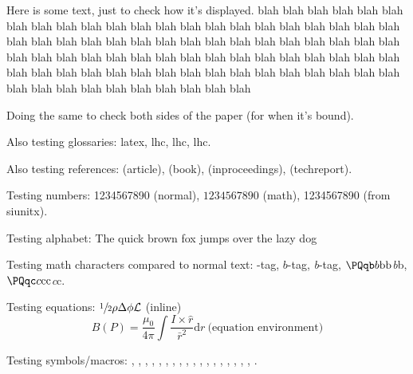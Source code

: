 \newpage

Here is some text, just to check how it's displayed. blah blah blah blah blah blah blah blah blah blah blah blah blah blah blah blah blah blah blah blah blah blah blah blah blah blah blah blah blah blah blah blah blah blah blah blah blah blah blah blah blah blah blah blah blah blah blah blah blah blah blah blah blah blah blah blah blah blah blah blah blah blah blah blah blah blah blah blah blah blah blah blah blah blah blah blah blah blah blah blah 

\newpage

Doing the same to check both sides of the paper (for when it's bound).

Also testing glossaries: \gls{latex}, \acrlong{lhc}, \acrshort{lhc}, \acrfull{lhc}.

Also testing references: \cite{CMS-PAPER-SUS-15-005-published} (article), \cite{tagkey1984quarksandleptons} (book), \cite{Lisanti:2016jxe} (inproceedings), \cite{CMS-PAS-SUS-15-005} (techreport).

Testing numbers: 1234567890 (normal), $1234567890$ (math), \si{1234567890} (from siunitx).

Testing alphabet: The quick brown fox jumps over the lazy dog

Testing math characters compared to normal text: \Pqb-tag, $b$-tag, \emph{b}-tag, $\Pqb b\mathrm{b}\text{b}$\emph{b}b, $\Pqc c\mathrm{c}\text{c}$\emph{c}c.

Testing equations: $\sfrac{1}{2} \rho \Delta \phi \mathcal{L}$ (inline)
\begin{equation}
B(P) = \frac{\mu_0}{4\pi} \int \frac{I \times \hat{r}}{\bar{r}^2}\mathrm{d}r \ \text{(equation environment)}
\end{equation}

Testing symbols/macros: \eV, \MeV, \GeV, \TeV, \pt, \ptmiss, \met, \HT, \mht, \mt, \aDark, \rinv, \mqdark, \doubleMuCr, \doubleLepMass, \alphat, \ttbarpjets, \wtolnupjets, \LSP.

